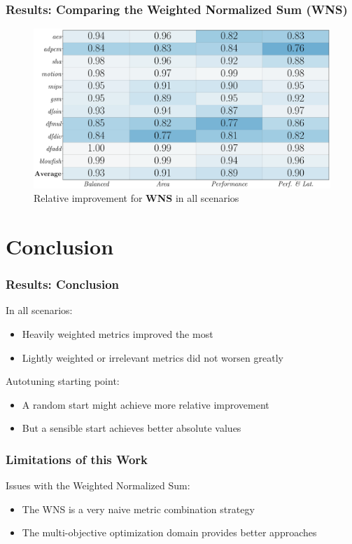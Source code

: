 \documentclass[10pt, compress, xcolor={table,xcdraw,usenames}, aspectratio=169]{beamer}
\begin{document}
\begin{frame}
    \frametitle{Results: Comparing the Weighted Normalized Sum (WNS)}
    \begin{figure}[htpb]
        \centering
        \includegraphics[width=0.8\columnwidth]{heatmap_wns_comparison}
        \caption{Relative improvement for \textbf{WNS} in all scenarios}
    \end{figure}
\end{frame}

\section{Conclusion}

\begin{frame}
    \frametitle{Results: Conclusion}
    \begin{block}{In all scenarios:}
        \begin{itemize}
            \item Heavily weighted metrics \alert{improved the most}
            \item Lightly weighted or irrelevant metrics \alert{did not worsen
                greatly}
        \end{itemize}
    \end{block}

    \begin{block}{Autotuning starting point:}
        \begin{itemize}
            \item A random start \alert{might achieve more relative
                improvement}
            \item But a sensible start \alert{achieves better absolute values}
        \end{itemize}
    \end{block}
\end{frame}

\begin{frame}
    \frametitle{Limitations of this Work}
    \begin{block}{Issues with the \alert{Weighted Normalized Sum}:}
        \begin{itemize}
            \item The WNS is a \alert{very naive metric combination strategy}
            \item The \alert{multi-objective optimization} domain provides
                \alert{better approaches}
        \end{itemize}
    \end{block}
\end{frame}
\end{document}
